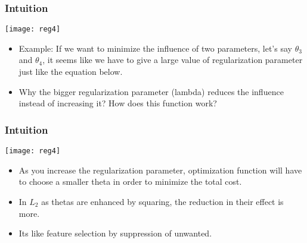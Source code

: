 \begin{frame}[fragile]\frametitle{Intuition}

\begin{center}
\texttt{[image: reg4]}
\end{center}

	\begin{itemize}
	\item Example: If we want to minimize the influence of two parameters, let's say $\theta_3$ and $\theta_4$, it seems like we have to give a large value of regularization parameter just like the equation below.
	

\item Why the bigger regularization parameter (lambda) reduces the influence instead of increasing it? How does this function work?

	\end{itemize}
	
\end{frame}

\begin{frame}[fragile]\frametitle{Intuition}
\begin{center}
\texttt{[image: reg4]}
\end{center}

	\begin{itemize}
\item As you increase the regularization parameter, optimization function will have to choose a smaller theta in order to minimize the total cost.
\item In $L_2$ as thetas are enhanced by squaring, the reduction in their effect is more.
\item Its like feature selection by suppression of unwanted.
	\end{itemize}
	
\end{frame}





